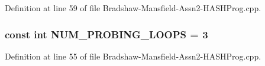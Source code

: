Definition at line 59 of file Bradshaw-\/Mansfield-\/Assn2-\/HASHProg.cpp.

\hypertarget{_bradshaw-_mansfield-_assn2-_h_a_s_h_prog_8cpp_ac3e309d0e80c3dd569ed3cfb701075a8}{
\subsubsection[{NUM\_\-PROBING\_\-LOOPS}]{\setlength{\rightskip}{0pt plus 5cm}const int {\bf NUM\_\-PROBING\_\-LOOPS} = 3}}
\label{_bradshaw-_mansfield-_assn2-_h_a_s_h_prog_8cpp_ac3e309d0e80c3dd569ed3cfb701075a8}


Definition at line 55 of file Bradshaw-\/Mansfield-\/Assn2-\/HASHProg.cpp.

